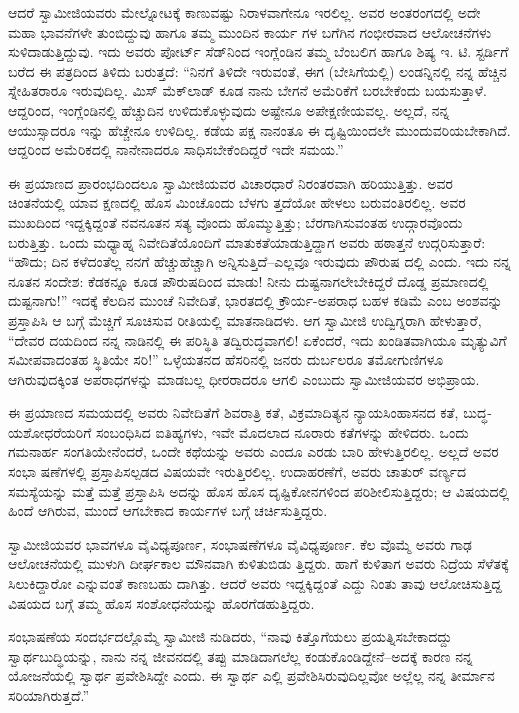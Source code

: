 ಆದರೆ ಸ್ವಾಮೀಜಿಯವರು ಮೇಲ್ನೋಟಕ್ಕೆ ಕಾಣುವಷ್ಟು ನಿರಾಳವಾಗೇನೂ ಇರಲಿಲ್ಲ. ಅವರ ಅಂತರಂಗದಲ್ಲಿ ಅದೇ ಮಹಾ ಭಾವನೆಗಳೇ ತುಂಬಿದ್ದುವು ಹಾಗೂ ತಮ್ಮ ಮುಂದಿನ ಕಾರ್ಯ ಗಳ ಬಗೆಗಿನ ಗಂಭೀರವಾದ ಆಲೋಚನೆಗಳು ಸುಳಿದಾಡುತ್ತಿದ್ದುವು. ಇದು ಅವರು ಪೋರ್ಟ್ ಸೆಡ್​ನಿಂದ ಇಂಗ್ಲೆಂಡಿನ ತಮ್ಮ ಬೆಂಬಲಿಗ ಹಾಗೂ ಶಿಷ್ಯ ಇ. ಟಿ. ಸ್ಟರ್ಡಿಗೆ ಬರೆದ ಈ ಪತ್ರದಿಂದ ತಿಳಿದು ಬರುತ್ತದೆ: “ನಿನಗೆ ತಿಳಿದೇ ಇರುವಂತೆ, ಈಗ (ಬೇಸಿಗೆಯಲ್ಲಿ) ಲಂಡನ್ನಿನಲ್ಲಿ ನನ್ನ ಹೆಚ್ಚಿನ ಸ್ನೇಹಿತರಾರೂ ಇರುವುದಿಲ್ಲ. ಮಿಸ್ ಮೆಕ್​ಲಾಡ್ ಕೂಡ ನಾನು ಬೇಗನೆ ಅಮೆರಿಕೆಗೆ ಬರಬೇಕೆಂದು ಬಯಸುತ್ತಾಳೆ. ಆದ್ದರಿಂದ, ಇಂಗ್ಲೆಂಡಿನಲ್ಲಿ ಹೆಚ್ಚುದಿನ ಉಳಿದುಕೊಳ್ಳುವುದು ಅಷ್ಟೇನೂ ಅಪೇಕ್ಷಣೀಯವಲ್ಲ. ಅಲ್ಲದೆ, ನನ್ನ ಆಯುಸ್ಸಾದರೂ ಇನ್ನು ಹೆಚ್ಚೇನೂ ಉಳಿದಿಲ್ಲ. ಕಡೆಯ ಪಕ್ಷ ನಾನಂತೂ ಈ ದೃಷ್ಟಿಯಿಂದಲೇ ಮುಂದುವರಿಯಬೇಕಾಗಿದೆ. ಆದ್ದರಿಂದ ಅಮೆರಿಕದಲ್ಲಿ ನಾನೇನಾದರೂ ಸಾಧಿಸಬೇಕೆಂದಿದ್ದರೆ ಇದೇ ಸಮಯ.”

ಈ ಪ್ರಯಾಣದ ಪ್ರಾರಂಭದಿಂದಲೂ ಸ್ವಾಮೀಜಿಯವರ ವಿಚಾರಧಾರೆ ನಿರಂತರವಾಗಿ ಹರಿಯುತ್ತಿತ್ತು. ಅವರ ಚಿಂತನೆಯಲ್ಲಿ ಯಾವ ಕ್ಷಣದಲ್ಲಿ ಹೊಸ ಮಿಂಚೊಂದು ಬೆಳಗು ತ್ತದೆಯೋ ಹೇಳಲು ಬರುವಂತಿರಲಿಲ್ಲ. ಅವರ ಮುಖದಿಂದ ಇದ್ದಕ್ಕಿದ್ದಂತೆ ನವನೂತನ ಸತ್ಯ ವೊಂದು ಹೊಮ್ಮುತ್ತಿತ್ತು; ಬೆರಗಾಗಿಸುವಂತಹ ಉದ್ಗಾರವೊಂದು ಬರುತ್ತಿತ್ತು. ಒಂದು ಮಧ್ಯಾಹ್ನ ನಿವೇದಿತೆಯೊಂದಿಗೆ ಮಾತುಕತೆಯಾಡುತ್ತಿದ್ದಾಗ ಅವರು ಹಠಾತ್ತನೆ ಉದ್ಗರಿಸುತ್ತಾರೆ: “ಹೌದು; ದಿನ ಕಳೆದಂತೆಲ್ಲ ನನಗೆ ಹೆಚ್ಚುಹೆಚ್ಚಾಗಿ ಅನ್ನಿಸುತ್ತಿದೆ–ಎಲ್ಲವೂ ಇರುವುದು ಪೌರುಷ ದಲ್ಲಿ ಎಂದು. ಇದು ನನ್ನ ನೂತನ ಸಂದೇಶ: ಕೆಡಕನ್ನೂ ಕೂಡ ಪೌರುಷದಿಂದ ಮಾಡು! ನೀನು ದುಷ್ಟನಾಗಲೇಬೇಕಿದ್ದರೆ ದೊಡ್ಡ ಪ್ರಮಾಣದಲ್ಲಿ ದುಷ್ಟನಾಗು!” ಇದಕ್ಕೆ ಕೆಲದಿನ ಮುಂಚೆ ನಿವೇದಿತೆ, ಭಾರತದಲ್ಲಿ ಕ್ರೌರ್ಯ-ಅಪರಾಧ ಬಹಳ ಕಡಿಮೆ ಎಂಬ ಅಂಶವನ್ನು ಪ್ರಸ್ತಾಪಿಸಿ ಆ ಬಗ್ಗೆ ಮೆಚ್ಚಿಗೆ ಸೂಚಿಸುವ ರೀತಿಯಲ್ಲಿ ಮಾತನಾಡಿದಳು. ಆಗ ಸ್ವಾಮೀಜಿ ಉದ್ವಿಗ್ನರಾಗಿ ಹೇಳುತ್ತಾರೆ, “ದೇವರ ದಯದಿಂದ ನನ್ನ ನಾಡಿನಲ್ಲಿ ಈ ಪರಿಸ್ಥಿತಿ ತದ್ವಿರುದ್ಧವಾಗಲಿ! ಏಕೆಂದರೆ, ಇದು ಖಂಡಿತವಾಗಿಯೂ ಮೃತ್ಯುವಿಗೆ ಸಮೀಪವಾದಂತಹ ಸ್ಥಿತಿಯೇ ಸರಿ!” ಒಳ್ಳೆಯತನದ ಹೆಸರಿನಲ್ಲಿ ಜನರು ದುರ್ಬಲರೂ ತಮೋಗುಣಿಗಳೂ ಆಗಿರುವುದಕ್ಕಿಂತ ಅಪರಾಧಗಳನ್ನು ಮಾಡಬಲ್ಲ ಧೀರರಾದರೂ ಆಗಲಿ ಎಂಬುದು ಸ್ವಾಮೀಜಿಯವರ ಅಭಿಪ್ರಾಯ.

ಈ ಪ್ರಯಾಣದ ಸಮಯದಲ್ಲಿ ಅವರು ನಿವೇದಿತೆಗೆ ಶಿವರಾತ್ರಿ ಕತೆ, ವಿಕ್ರಮಾದಿತ್ಯನ ನ್ಯಾಯಸಿಂಹಾಸನದ ಕತೆ, ಬುದ್ಧ-ಯಶೋಧರೆಯರಿಗೆ ಸಂಬಂಧಿಸಿದ ಐತಿಹ್ಯಗಳು, ಇವೇ ಮೊದಲಾದ ನೂರಾರು ಕತೆಗಳನ್ನು ಹೇಳಿದರು. ಒಂದು ಗಮನಾರ್ಹ ಸಂಗತಿಯೇನೆಂದರೆ, ಒಂದೇ ಕಥೆಯನ್ನು ಅವರು ಎಂದೂ ಎರಡು ಬಾರಿ ಹೇಳುತ್ತಿರಲಿಲ್ಲ. ಅಲ್ಲದೆ ಅವರ ಸಂಭಾ ಷಣೆಗಳಲ್ಲಿ ಪ್ರಸ್ತಾಪಿಸಲ್ಪಡದ ವಿಷಯವೇ ಇರುತ್ತಿರಲಿಲ್ಲ. ಉದಾಹರಣೆಗೆ, ಅವರು ಚಾತುರ್ ವರ್ಣ್ಯದ ಸಮಸ್ಯೆಯನ್ನು ಮತ್ತೆ ಮತ್ತೆ ಪ್ರಸ್ತಾಪಿಸಿ ಅದನ್ನು ಹೊಸ ಹೊಸ ದೃಷ್ಟಿಕೋನಗಳಿಂದ ಪರಿಶೀಲಿಸುತ್ತಿದ್ದರು; ಆ ವಿಷಯದಲ್ಲಿ ಹಿಂದೆ ಆಗಿರುವ, ಮುಂದೆ ಆಗಬೇಕಾದ ಕಾರ್ಯಗಳ ಬಗ್ಗೆ ಚರ್ಚಿಸುತ್ತಿದ್ದರು.

ಸ್ವಾಮೀಜಿಯವರ ಭಾವಗಳೂ ವೈವಿಧ್ಯಪೂರ್ಣ, ಸಂಭಾಷಣೆಗಳೂ ವೈವಿಧ್ಯಪೂರ್ಣ. ಕೆಲ ವೊಮ್ಮೆ ಅವರು ಗಾಢ ಆಲೋಚನೆಯಲ್ಲಿ ಮುಳುಗಿ ದೀರ್ಘಕಾಲ ಮೌನವಾಗಿ ಕುಳಿತುಬಿಡು ತ್ತಿದ್ದರು. ಹಾಗೆ ಕುಳಿತಾಗ ಅವರು ನಿದ್ರೆಯ ಸೆಳೆತಕ್ಕೆ ಸಿಲುಕಿದ್ದಾರೋ ಎನ್ನುವಂತೆ ಕಾಣಬಹು ದಾಗಿತ್ತು. ಆದರೆ ಅವರು ಇದ್ದಕ್ಕಿದ್ದಂತೆ ಎದ್ದು ನಿಂತು ತಾವು ಆಲೋಚಿಸುತ್ತಿದ್ದ ವಿಷಯದ ಬಗ್ಗೆ ತಮ್ಮ ಹೊಸ ಸಂಶೋಧನೆಯನ್ನು ಹೊರಗೆಡಹುತ್ತಿದ್ದರು.

ಸಂಭಾಷಣೆಯ ಸಂದರ್ಭದಲ್ಲೊಮ್ಮೆ ಸ್ವಾಮೀಜಿ ನುಡಿದರು, “ನಾವು ಕಿತ್ತೊಗೆಯಲು ಪ್ರಯತ್ನಿಸಬೇಕಾದದ್ದು ಸ್ವಾರ್ಥಬುದ್ಧಿಯನ್ನು, ನಾನು ನನ್ನ ಜೀವನದಲ್ಲಿ ತಪ್ಪು ಮಾಡಿದಾಗಲೆಲ್ಲ ಕಂಡುಕೊಂಡಿದ್ದೇನೆ–ಅದಕ್ಕೆ ಕಾರಣ ನನ್ನ ಯೋಜನೆಯಲ್ಲಿ ಸ್ವಾರ್ಥ ಪ್ರವೇಶಿಸಿದ್ದೇ ಎಂದು. ಈ ಸ್ವಾರ್ಥ ಎಲ್ಲಿ ಪ್ರವೇಶಿಸಿರುವುದಿಲ್ಲವೋ ಅಲ್ಲೆಲ್ಲ ನನ್ನ ತೀರ್ಮಾನ ಸರಿಯಾಗಿರುತ್ತದೆ.”

